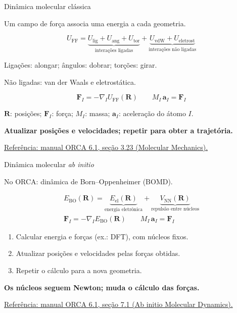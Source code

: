 \documentclass[aspectratio=169,11pt]{beamer}
\newcommand{\lead}[1]{{\color{Muted}#1\par}}
\newcommand{\takeaway}[1]{\par\vfill{\color{Teal}\bfseries #1\par}}
\newcommand{\source}[2]{{\fontsize{9}{11}\selectfont\color{Muted}\href{#1}{#2}\par}}
\newcommand{\R}{\mathbf R}
\newcommand{\F}{\mathbf F}
\newenvironment{conceptmath}{\vspace{-3mm}\begingroup\fontsize{15}{17}\selectfont}{\endgroup\ignorespacesafterend}
\begin{document}
\begin{frame}[t,label=md-classica]{Dinâmica molecular clássica}
\lead{Um campo de força associa uma energia a cada geometria.}
\begin{conceptmath}
\[
 U_{\mathrm{FF}}=
 \underbrace{U_{\mathrm{lig}}+U_{\mathrm{ang}}+U_{\mathrm{tor}}}_{\text{interações ligadas}}
 +\underbrace{U_{\mathrm{vdW}}+U_{\mathrm{eletrost}}}_{\text{interações não ligadas}}
\]
\end{conceptmath}
{\fontsize{11}{14}\selectfont\color{Muted}
Ligações: alongar; ângulos: dobrar; torções: girar.\par
Não ligadas: van der Waals e eletrostática.\par}
\begin{conceptmath}
\[
 \F_I=-\nabla_I U_{\mathrm{FF}}(\R)
 \qquad
 M_I\,\mathbf a_I=\F_I
\]
\end{conceptmath}
{\fontsize{11}{14}\selectfont\color{Muted}
$\R$: posições; $\F_I$: força; $M_I$: massa; $\mathbf a_I$: aceleração do átomo $I$.\par}
\takeaway{Atualizar posições e velocidades; repetir para obter a trajetória.}
\source{https://www.faccts.de/docs/orca/6.1/manual/contents/modelchemistries/mm.html}{Referência: manual ORCA 6.1, seção 3.23 (Molecular Mechanics).}
\end{frame}

\begin{frame}[t,label=aimd]{Dinâmica molecular \textit{ab initio}}
\lead{No ORCA: dinâmica de Born--Oppenheimer (BOMD).}
\begin{conceptmath}
\begin{gather*}
 E_{\mathrm{BO}}(\R)=
 \underbrace{E_{\mathrm{el}}(\R)}_{\text{energia eletrônica}}
 +\underbrace{V_{\mathrm{NN}}(\R)}_{\text{repulsão entre núcleos}}
 \\[2mm]
 \F_I=-\nabla_I E_{\mathrm{BO}}(\R)
 \qquad
 M_I\,\mathbf a_I=\F_I
\end{gather*}
\end{conceptmath}
\vspace{-7mm}
\begin{enumerate}
 \setlength{\itemsep}{1mm}
 \item Calcular energia e forças (ex.: DFT), com núcleos fixos.
 \item Atualizar posições e velocidades pelas forças obtidas.
 \item Repetir o cálculo para a nova geometria.
\end{enumerate}
\takeaway{Os núcleos seguem Newton; muda o cálculo das forças.}
\source{https://www.faccts.de/docs/orca/6.1/manual/contents/moleculardynamics/moldyn.html}{Referência: manual ORCA 6.1, seção 7.1 (Ab initio Molecular Dynamics).}
\end{frame}
\end{document}
